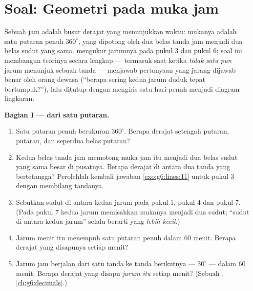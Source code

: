 \section{Soal: Geometri pada muka jam}

\begin{problem}
\label{pb:g6:lines:1}
Sebuah jam adalah busur derajat yang menunjukkan waktu: mukanya
adalah satu putaran penuh $360^\circ$, yang dipotong oleh dua belas
tanda jam menjadi dua belas sudut yang sama. 
mengukur jarumnya pada pukul 3 dan pukul 6; soal ini membangun
teorinya secara lengkap --- termasuk saat ketika \emph{tidak satu
pun} jarum menunjuk sebuah tanda --- menjawab pertanyaan yang jarang
dijawab benar oleh orang dewasa (``berapa sering kedua jarum duduk
tepat bertumpuk?''), lalu ditutup dengan mengiris satu hari penuh
menjadi diagram lingkaran.

\medskip
\noindent\textbf{Bagian I ---  dari satu putaran.}
\begin{enumerate}
  \item Satu putaran penuh berukuran $360^\circ$. Berapa derajat
        setengah putaran,  putaran, dan seperdua belas
        putaran?
  \item Kedua belas tanda jam memotong muka jam itu menjadi dua
        belas sudut yang sama besar di pusatnya. Berapa derajat di antara dua tanda yang
        bertetangga? Perolehlah kembali jawaban
        \cref{exo:g6:lines:11} untuk pukul 3 dengan membilang tandanya.
  \item Sebutkan sudut di antara kedua jarum pada pukul 1, pukul 4 dan
        pukul 7. (Pada pukul 7 kedua jarum memisahkan mukanya menjadi
        dua sudut; ``sudut di antara kedua jarum'' selalu berarti yang
        \emph{lebih kecil}.)
  \item Jarum menit itu menempuh satu putaran penuh dalam $60$ menit.
        Berapa derajat yang disapunya setiap menit?
  \item Jarum jam berjalan dari satu tanda ke tanda berikutnya ---
        $30^\circ$ --- dalam $60$ menit. Berapa derajat yang disapu
        \emph{jarum itu} setiap menit? (Sebuah ,
        \cref{ch:g6:decimals}.)
\end{enumerate}


\end{problem}
